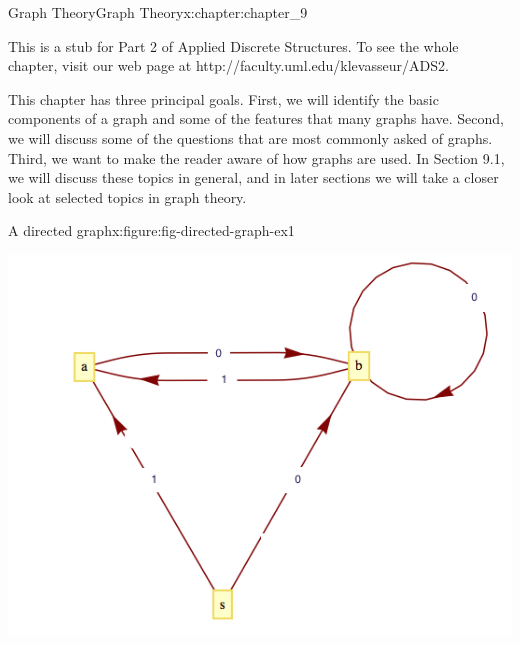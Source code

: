 \documentclass[oneside,10pt,]{book}
\numberwithin{equation}{section}
\begin{document}
\begin{chapterptx}{Graph Theory}{}{Graph Theory}{}{}{x:chapter:chapter_9}
\begin{introduction}{}%
This is a stub for Part 2 of Applied Discrete Structures. To see the whole chapter, visit our web page at http:\slash{}\slash{}faculty.uml.edu\slash{}klevasseur\slash{}ADS2.%
\par
This chapter has three principal goals. First, we will identify the basic components of a graph and some of the features that many graphs have. Second, we will discuss some of the questions that are most commonly asked of graphs. Third, we want to make the reader aware of how graphs are used. In Section 9.1, we will discuss these topics in general, and in later sections we will take a closer look at selected topics in graph theory.%
\end{introduction}%
\begin{figureptx}{A directed graph}{x:figure:fig-directed-graph-ex1}{}%
\begin{image}{0.125}{0.75}{0.125}%
\includegraphics[width=\linewidth]{images/fig-directed-graph-ex1.png}
\end{image}%
\tcblower
\end{figureptx}%
\end{chapterptx}
%
%
\typeout{************************************************}
\typeout{************************************************}
%
\end{document}
